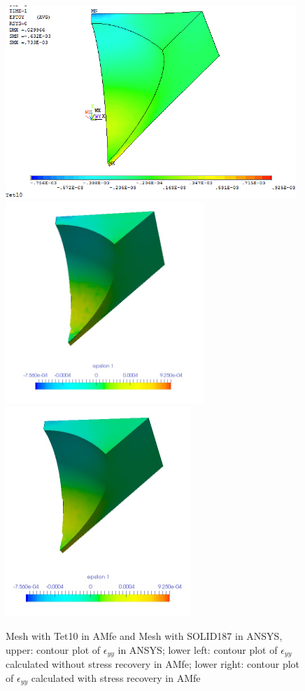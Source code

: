\begin{figure}[htbp]
	\begin{center}
		\includegraphics[width=11cm,clip]{Tet10_Eyy.png} 	
		\includegraphics[width=7.5cm,clip]{Tet10_Eyy_PD.png} 		
		\includegraphics[width=7cm,clip]{Tet10_Eyy_P.png} 		
		\caption{Mesh with Tet10 in AMfe and Mesh with SOLID187 in ANSYS, upper: contour plot of $\epsilon_{yy}$ in ANSYS; lower left: contour plot of $\epsilon_{yy}$ calculated without stress recovery in AMfe; lower right: contour plot of $\epsilon_{yy}$ calculated with stress recovery in AMfe} \label{fig: Tet10_Eyy}
	\end{center}
\end{figure}
\clearpage 

